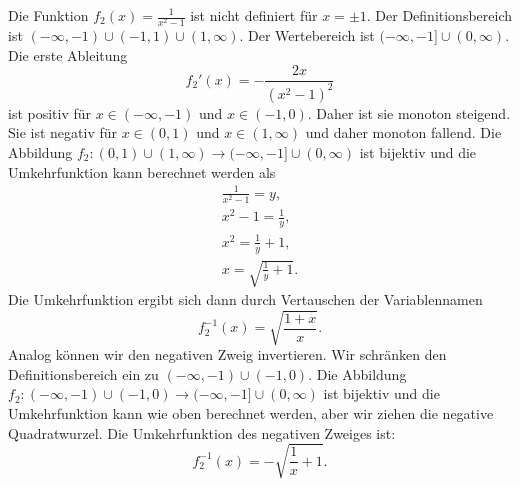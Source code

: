 {\begin{iii}
\newpage
\item
Die Funktion $f_2(x) = \frac{1}{x^2-1}$ ist nicht definiert für $x = \pm 1$.
Der Definitionsbereich ist $(-\infty,-1) \cup (-1,1) \cup (1,\infty)$.
Der Wertebereich ist $(-\infty,-1] \cup (0,\infty)$. 
Die erste Ableitung  
$$
f_2'(x) = -\frac{2x}{(x^2 - 1)^2}
$$
ist positiv f\"ur $x \in (-\infty, -1)$ und $x \in (-1,0)$. Daher ist sie monoton steigend. 
Sie ist negativ f\"ur $x \in (0,1)$ und $x \in (1,\infty)$ und daher monoton fallend. 
Die Abbildung $f_2 : (0,1) \cup (1,\infty) \to (-\infty,-1] \cup (0,\infty)$ ist bijektiv und 
die Umkehrfunktion kann berechnet werden als
\begin{align*}
\frac{1}{x^2-1}=y,\\
x^2-1 = \frac{1}{y},\\
x^2 = \frac{1}{y} + 1,\\
x = \sqrt{\frac{1}{y} + 1}.
\end{align*}
Die Umkehrfunktion ergibt sich dann durch Vertauschen der Variablennamen
$$f_2^{-1}(x)=\sqrt{\frac{1+x}{x}}.$$
Analog k\"onnen wir den negativen Zweig invertieren. Wir schr\"anken den Definitionsbereich ein zu $(-\infty,-1)\cup(-1,0)$.
Die Abbildung $f_2: (-\infty,-1)\cup(-1,0) \to (-\infty,-1]\cup (0,\infty)$ ist bijektiv und die Umkehrfunktion 
kann wie oben berechnet werden, aber wir ziehen die negative Quadratwurzel. Die Umkehrfunktion des negativen 
Zweiges ist:
$$f_2^{-1}(x)=-\sqrt{\frac{1}{x}+1}.$$


\end{iii}}

